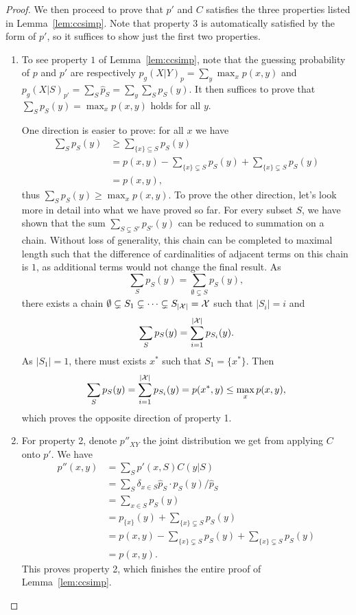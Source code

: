 \begin{proof}
	We then proceed to prove that $p'$ and $C$ satisfies the three properties listed in Lemma~\ref{lem:ccsimp}. Note that property 3 is automatically satisfied by the form of $p'$, so it suffices to show just the first two properties.
    
    \begin{enumerate}
    \item To see property $1$ of Lemma~\ref{lem:ccsimp}, note that the guessing probability of $p$ and $p'$ are respectively
    $p_g(X|Y)_{p}=\sum_y\max_xp(x,y)$
    and $p_g(X|S)_{p'}=\sum_S\hat{p}_S=\sum_y\sum_Sp_S(y)$. It then suffices to prove that $\sum_S p_S(y)=\max_x p(x,y)$ holds for all $y$. 
    
    One direction is easier to prove: for all $x$ we have
    \begin{align*}
        \sum_{S}p_{S}(y)&\geq \sum_{\{x\}\subseteq S}p_{S}(y)\\
        &=p(x,y)-\sum_{\{x\}\subsetneq S}p_S(y)+\sum_{\{x\}\subsetneq S}p_S(y)\\
        &= p(x,y),
    \end{align*}
    thus $\sum_{S}p_S(y)\geq \max_x p(x,y)$. To prove the other direction, let's look more in detail into what we have proved so far. For every subset $S$, we have shown that the sum $\sum_{S\subsetneq S'}p_{S'}(y)$ can be reduced to summation on a chain. Without loss of generality, this chain can be completed to maximal length such that the difference of cardinalities of adjacent terms on this chain is $1$, as additional terms would not change the final result. As
    $$\sum_{S}p_S(y)=\sum_{\emptyset\subsetneq S}p_S(y),$$ there exists a chain $\emptyset\subsetneq S_1\subsetneq\cdots\subsetneq S_{|\mathcal{X}|}=\mathcal{X}$ such that $|S_i|=i$ and
    $$\sum_{S}p_S(y)=\sum_{i=1}^{|\mathcal{X}|}p_{S_i}(y).$$ 
    As $|S_1|=1$, there must exists $x^*$ such that $S_1=\{x^*\}$. Then $$\sum_Sp_S(y)=\sum_{i=1}^{|\mathcal{X}|}p_{S_i}(y)=p(x^*,y)\leq \max_x p(x,y),$$ which proves the opposite direction of property 1.
	\item  For property 2, denote $p''_{XY}$ the joint distribution we get from applying $C$ onto $p'$. We have
    \begin{align*}
        p''(x,y)&=\sum_{S}p'(x,S)C(y|S)\\
        &=\sum_S \delta_{x\in S} \hat{p}_S\cdot p_S(y)/\hat{p}_S\\
        &=\sum_{x\in S}p_S(y)\\
        &=p_{\{x\}}(y)+\sum_{\{x\}\subsetneq S}p_S(y)\\
        &=p(x,y)-\sum_{\{x\}\subsetneq S}p_S(y)+\sum_{\{x\}\subsetneq S}p_S(y)\\
        &= p(x,y).
    \end{align*}
    This proves property 2, which finishes the entire proof of Lemma~\ref{lem:ccsimp}.
    \end{enumerate}
\end{proof}
